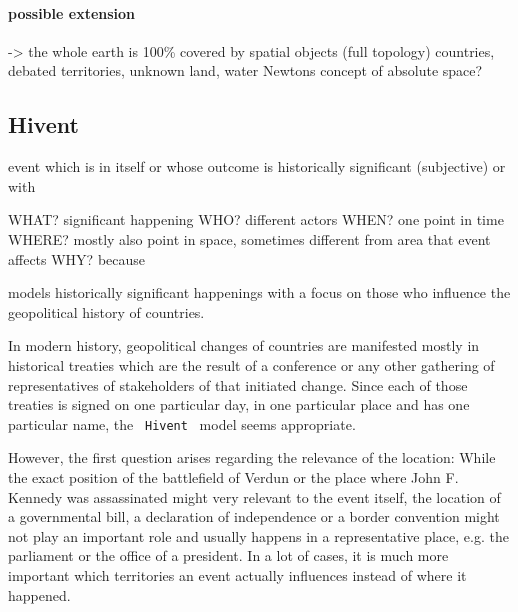 

\paragraph{possible extension} %
\label{par:possible_extension}


-> the whole earth is 100\% covered by spatial objects (full topology)
  countries, debated territories, unknown land, water
  Newtons concept of absolute space?



\subsection{Hivent} %
\label{sub:hivent}

event which is in itself or whose outcome is historically significant (subjective) or with

  WHAT? significant happening
  WHO? different actors
  WHEN? one point in time
  WHERE? mostly also point in space, sometimes different from area that event affects
  WHY? because

models historically significant happenings with a focus on those who influence the geopolitical history of countries.

In modern history, geopolitical changes of countries are manifested mostly in historical treaties which are the result of a conference or any other gathering of representatives of stakeholders of that initiated change. Since each of those treaties is signed on one particular day, in one particular place and has one particular name, the ~\texttt{Hivent}~ model seems appropriate.

However, the first question arises regarding the relevance of the location: While the exact position of the battlefield of Verdun or the place where John F. Kennedy was assassinated might very relevant to the event itself, the location of a governmental bill, a declaration of independence or a border convention might not play an important role and usually happens in a representative place, e.g. the parliament or the office of a president. In a lot of cases, it is much more important which territories an event actually influences instead of where it happened.

